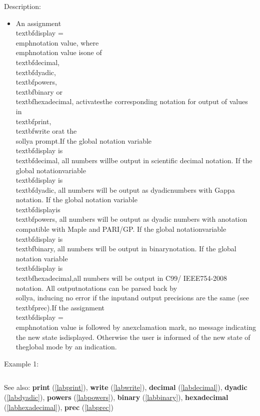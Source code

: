 \noindent Description: \begin{itemize}

\item An assignment \\textbf{display} = \\emph{notation value}, where \\emph{notation value} is\n   one of \\textbf{decimal}, \\textbf{dyadic}, \\textbf{powers}, \\textbf{binary} or \\textbf{hexadecimal}, activates\n   the corresponding notation for output of values in \\textbf{print}, \\textbf{write} or\n   at the \\sollya prompt.\n    \n   If the global notation variable \\textbf{display} is \\textbf{decimal}, all numbers will\n   be output in scientific decimal notation.  If the global notation\n   variable \\textbf{display} is \\textbf{dyadic}, all numbers will be output as dyadic\n   numbers with Gappa notation.  If the global notation variable \\textbf{display}\n   is \\textbf{powers}, all numbers will be output as dyadic numbers with a\n   notation compatible with Maple and PARI/GP.  If the global notation\n   variable \\textbf{display} is \\textbf{binary}, all numbers will be output in binary\n   notation.  If the global notation variable \\textbf{display} is \\textbf{hexadecimal},\n   all numbers will be output in C99/ IEEE754-2008 notation.  All output\n   notations can be parsed back by \\sollya, inducing no error if the input\n   and output precisions are the same (see \\textbf{prec}).\n    \n   If the assignment \\textbf{display} = \\emph{notation value} is followed by an\n   exclamation mark, no message indicating the new state is\n   displayed. Otherwise the user is informed of the new state of the\n   global mode by an indication.\n\end{itemize}
\noindent Example 1: 
\begin{center}\begin{minipage}{15cm}\begin{Verbatim}[frame=single]
\end{Verbatim}
\end{minipage}\end{center}
See also: \textbf{print} (\ref{labprint}), \textbf{write} (\ref{labwrite}), \textbf{decimal} (\ref{labdecimal}), \textbf{dyadic} (\ref{labdyadic}), \textbf{powers} (\ref{labpowers}), \textbf{binary} (\ref{labbinary}), \textbf{hexadecimal} (\ref{labhexadecimal}), \textbf{prec} (\ref{labprec})
